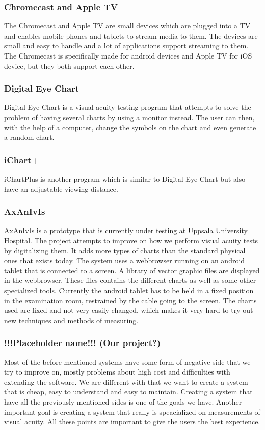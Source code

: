 \documentclass[12pt,a4paper,notitlepage]{report}
\begin{document}
\subsubsection{Chromecast and Apple TV}
The Chromecast \cite{chromecast} and Apple TV \cite{appletv} are small devices which are plugged into a TV and enables mobile phones and tablets to stream media to them. The devices are small and easy to handle and a lot of applications support streaming to them. The Chromecast is specifically made for android devices and Apple TV for iOS device, but they both support each other.

\subsubsection{Digital Eye Chart}
 Digital Eye Chart \cite{digitaleyechart} is a visual acuity testing program that attempts to solve the problem of having several charts by using a monitor instead. The user can then, with the help of a computer, change the symbols on the chart and even generate a random chart. 

\subsubsection{iChart+}
iChartPlus \cite{ichartplus} is another program which is similar to Digital Eye Chart but also have an adjustable viewing distance. 

\subsubsection{AxAnIvIs}
AxAnIvIs is a prototype that is currently under testing at Uppsala University Hospital. The project attempts to improve on how we perform visual acuity tests by digitalizing them. It adds more types of charts than the standard physical ones that exists today. The system uses a webbrowser running on an android tablet that is connected to a screen. A library of vector graphic files are displayed in the webbrowser. These files contains the different charts as well as some other specialized tools. Currently the android tablet has to be held in a fixed position in the examination room, restrained by the cable going to the screen. The charts used are fixed and not very easily changed, which makes it very hard to try out new techniques and methods of measuring.

\subsubsection{!!!Placeholder name!!! (Our project?)} %
Most of the before mentioned systems have some form of negative side that we try to improve on, mostly problems about high cost and difficulties with extending the software. We are different with that we want to create a system that is cheap, easy to understand and easy to maintain. Creating a system that have all the previously mentioned sides is one of the goals we have. Another important goal is creating a system that really is speacialized on measurements of visual acuity. All these points are important to give the users the best experience.
\end{document}
